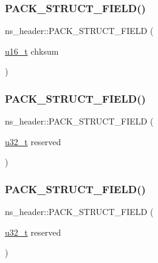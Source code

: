 \subsubsection{\texorpdfstring{P\+A\+C\+K\+\_\+\+S\+T\+R\+U\+C\+T\+\_\+\+F\+I\+E\+L\+D()}{PACK\_STRUCT\_FIELD()}\hspace{0.1cm}{\footnotesize\ttfamily [2/4]}}
{\footnotesize\ttfamily ns\+\_\+header\+::\+P\+A\+C\+K\+\_\+\+S\+T\+R\+U\+C\+T\+\_\+\+F\+I\+E\+LD (\begin{DoxyParamCaption}\item[{\hyperlink{group__compiler__abstraction_ga77570ac4fcab86864fa1916e55676da2}{u16\+\_\+t}}]{chksum }\end{DoxyParamCaption})}

\mbox{\label{structns__header_ac7f435b2b9fc1cedabca99289e055a7c}} 
\subsubsection{\texorpdfstring{P\+A\+C\+K\+\_\+\+S\+T\+R\+U\+C\+T\+\_\+\+F\+I\+E\+L\+D()}{PACK\_STRUCT\_FIELD()}\hspace{0.1cm}{\footnotesize\ttfamily [3/4]}}
{\footnotesize\ttfamily ns\+\_\+header\+::\+P\+A\+C\+K\+\_\+\+S\+T\+R\+U\+C\+T\+\_\+\+F\+I\+E\+LD (\begin{DoxyParamCaption}\item[{\hyperlink{group__compiler__abstraction_ga4c14294869aceba3ef9d4c0c302d0f33}{u32\+\_\+t}}]{reserved }\end{DoxyParamCaption})}

\mbox{\label{structns__header_ac7f435b2b9fc1cedabca99289e055a7c}} 
\subsubsection{\texorpdfstring{P\+A\+C\+K\+\_\+\+S\+T\+R\+U\+C\+T\+\_\+\+F\+I\+E\+L\+D()}{PACK\_STRUCT\_FIELD()}\hspace{0.1cm}{\footnotesize\ttfamily [4/4]}}
{\footnotesize\ttfamily ns\+\_\+header\+::\+P\+A\+C\+K\+\_\+\+S\+T\+R\+U\+C\+T\+\_\+\+F\+I\+E\+LD (\begin{DoxyParamCaption}\item[{\hyperlink{group__compiler__abstraction_ga4c14294869aceba3ef9d4c0c302d0f33}{u32\+\_\+t}}]{reserved }\end{DoxyParamCaption})}

